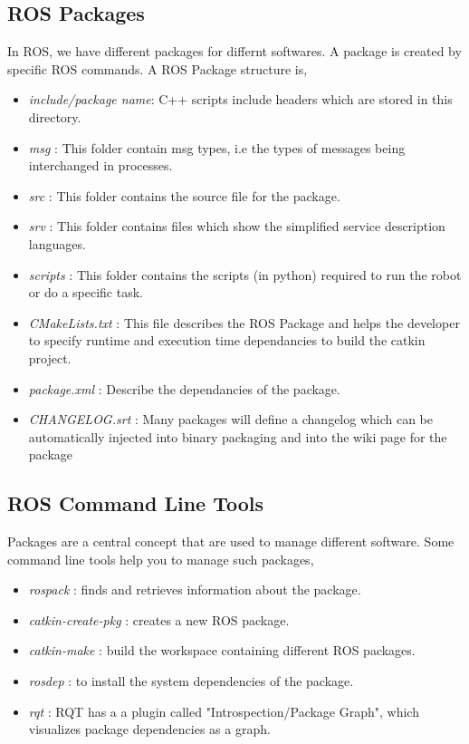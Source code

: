 \subsection{ROS Packages}
In ROS, we have different packages for differnt softwares. A package is created by specific ROS commands. A ROS Package structure is,
\begin{itemize}
    \item \textit{include/package name}: C++ scripts include headers which are stored in this directory.
    \item \textit{msg} : This folder contain msg types, i.e the types of messages being interchanged in processes.
    \item \textit{src} : This folder contains the source file for the package.
    \item \textit{srv} : This folder contains files which show the simplified service description languages.
    \item \textit{scripts} : This folder contains the scripts (in python) required to run the robot or do a specific task.
    \item \textit{CMakeLists.txt} : This file describes the ROS Package and helps the developer to specify runtime and execution time dependancies to build the catkin project.
    \item \textit{package.xml} : Describe the dependancies of the package.
    \item \textit{CHANGELOG.srt} : Many packages will define a changelog which can be automatically injected into binary packaging and into the wiki page for the package
\end{itemize}

\subsection{ROS Command Line Tools}
Packages are a central concept that are used to manage different software. Some command line tools help you to manage such packages, 
\begin{itemize}
    \item \textit{rospack} : finds and retrieves information about the package.
    \item \textit{catkin-create-pkg} : creates a new ROS package. 
    \item \textit{catkin-make} : build the workspace containing different ROS packages.
    \item \textit{rosdep} : to install the system dependencies of the package.
    \item \textit{rqt} : RQT has a  a plugin called "Introspection/Package Graph", which visualizes package dependencies as a graph.
\end{itemize} 

